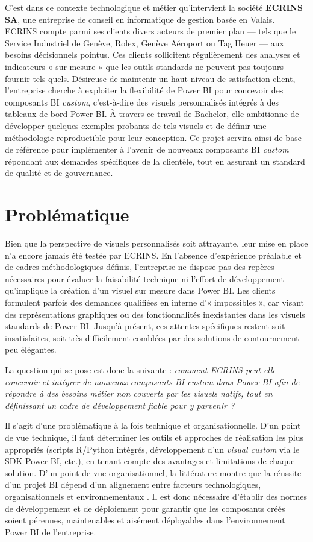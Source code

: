 C’est dans ce contexte technologique et métier qu’intervient la société \textbf{ECRINS SA}, une entreprise de conseil en informatique de gestion basée en Valais. ECRINS compte parmi ses clients divers acteurs de premier plan — tels que le Service Industriel de Genève, Rolex, Genève Aéroport ou Tag Heuer — aux besoins décisionnels pointus. Ces clients sollicitent régulièrement des analyses et indicateurs « sur mesure » que les outils standards ne peuvent pas toujours fournir tels quels. Désireuse de maintenir un haut niveau de satisfaction client, l’entreprise cherche à exploiter la flexibilité de Power BI pour concevoir des composants BI \emph{custom}, c’est-à-dire des visuels personnalisés intégrés à des tableaux de bord Power BI. À travers ce travail de Bachelor, elle ambitionne de développer quelques exemples probants de tels visuels et de définir une méthodologie reproductible pour leur conception. Ce projet servira ainsi de base de référence pour implémenter à l’avenir de nouveaux composants BI \emph{custom} répondant aux demandes spécifiques de la clientèle, tout en assurant un standard de qualité et de gouvernance.  

\section{Problématique}

Bien que la perspective de visuels personnalisés soit attrayante, leur mise en place n’a encore jamais été testée par ECRINS. En l’absence d’expérience préalable et de cadres méthodologiques définis, l’entreprise ne dispose pas des repères nécessaires pour évaluer la faisabilité technique ni l’effort de développement qu’implique la création d’un visuel sur mesure dans Power BI. Les clients formulent parfois des demandes qualifiées en interne d’« impossibles », car visant des représentations graphiques ou des fonctionnalités inexistantes dans les visuels standards de Power BI. Jusqu’à présent, ces attentes spécifiques restent soit insatisfaites, soit très difficilement comblées par des solutions de contournement peu élégantes.  

La question qui se pose est donc la suivante : \textit{comment ECRINS peut-elle concevoir et intégrer de nouveaux composants BI \emph{custom} dans Power BI afin de répondre à des besoins métier non couverts par les visuels natifs, tout en définissant un cadre de développement fiable pour y parvenir ?}  

Il s’agit d’une problématique à la fois technique et organisationnelle. D’un point de vue technique, il faut déterminer les outils et approches de réalisation les plus appropriés (scripts R/Python intégrés, développement d’un \emph{visual custom} via le SDK Power BI, etc.), en tenant compte des avantages et limitations de chaque solution. D’un point de vue organisationnel, la littérature montre que la réussite d’un projet BI dépend d’un alignement entre facteurs technologiques, organisationnels et environnementaux \parencite{AlKharusi2023}. Il est donc nécessaire d’établir des normes de développement et de déploiement pour garantir que les composants créés soient pérennes, maintenables et aisément déployables dans l’environnement Power BI de l’entreprise.  

